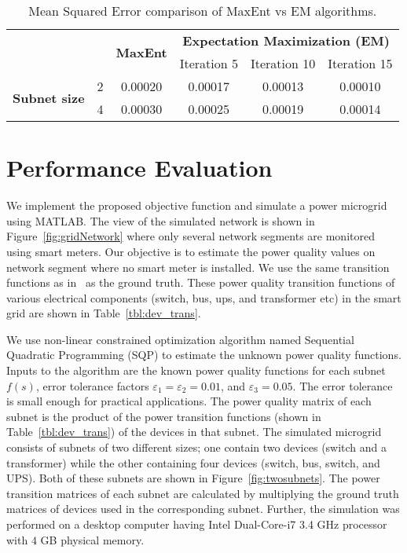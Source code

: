 \begin{table}[!p]
\renewcommand{\tabcolsep}{0.2 cm}
\renewcommand*{\arraystretch}{2}
\centering \caption{Mean Squared Error comparison of MaxEnt vs EM algorithms.}
\begin{tabular}{|c|c|c|c|c|c|}
 \hline \multicolumn{2}{|c|}{\multirow{2}{*}{}} & \multirow{2}{*}{\textbf{MaxEnt}} & \multicolumn{3}{c|}{\textbf{Expectation Maximization (EM)}}\\
\cline{4-6}
\multicolumn{2}{|c|}{} & & Iteration 5 & Iteration 10 & Iteration 15\\
\hline
\multirow{2}{*}{\textbf{Subnet size}} & 2 & 0.00020 & 0.00017 & 0.00013 & 0.00010\\
\cline{2-6}
& 4 & 0.00030 & 0.00025 & 0.00019 & 0.00014\\
\hline
\end{tabular}
\vspace{4cm}
\label{tbl:eval_mse}
\end{table}

\section{Performance Evaluation}
\label{sec:evaluation}
We implement the proposed objective function and simulate a power microgrid using MATLAB. The view of the simulated network is shown in Figure~\ref{fig:gridNetwork} where only several network segments are monitored using smart meters. Our objective is to estimate the power quality values on network segment where no smart meter is installed. We use the same transition functions as in~\cite{catherine_pri} as the ground truth. These power quality transition functions of various electrical components (switch, bus, ups, and transformer etc) in the smart grid are shown in Table~\ref{tbl:dev_trans}.

We use non-linear constrained optimization algorithm named Sequential Quadratic Programming (SQP) to estimate the unknown power quality functions. Inputs to the algorithm are the known power quality functions for each subnet $f(s)$, error tolerance factors $\varepsilon_1 = \varepsilon_2 = 0.01$, and $ \varepsilon_3 = 0.05$. The error tolerance is small enough for practical applications. The power quality matrix of each subnet is the product of the power transition functions (shown in Table~\ref{tbl:dev_trans}) of the devices in that subnet. The simulated microgrid consists of subnets of two different sizes; one contain two devices (switch and a transformer) while the other containing four devices (switch, bus, switch, and UPS). Both of these subnets are shown in Figure~\ref{fig:twosubnets}. The power transition matrices of each subnet are calculated by multiplying the ground truth matrices of devices used in the corresponding subnet. Further, the simulation was performed on a desktop computer having Intel Dual-Core-i7 3.4 GHz processor with $4$ GB physical memory.

